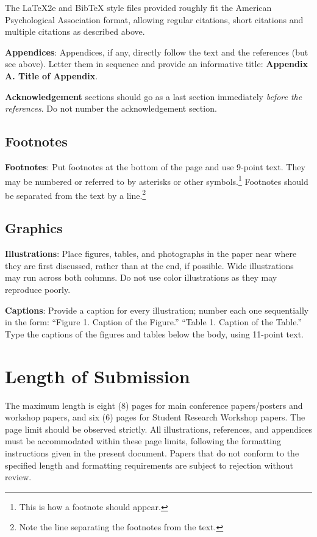 \documentclass[11pt]{article}
\begin{document}
The \LaTeX2e{} and Bib\TeX{} style files provided roughly fit the
American Psychological Association format, allowing regular citations, 
short citations and multiple citations as described above.

{\bf Appendices}: Appendices, if any, directly follow the text and the
references (but see above).  Letter them in sequence and provide an
informative title: {\bf Appendix A. Title of Appendix}.

\textbf{Acknowledgement} sections should go as a last section immediately
\emph{before the references}.  Do not number the acknowledgement section.

\subsection{Footnotes}

{\bf Footnotes}: Put footnotes at the bottom of the page and use 9-point text. They may be numbered or referred to by asterisks or other
symbols.\footnote{This is how a footnote should appear.} Footnotes
should be separated from the text by a line.\footnote{Note the line
separating the footnotes from the text.}

\subsection{Graphics}

{\bf Illustrations}: Place figures, tables, and photographs in the
paper near where they are first discussed, rather than at the end, if
possible.  Wide illustrations may run across both columns. Do not use
color illustrations as they may reproduce poorly.

{\bf Captions}: Provide a caption for every illustration; number each one
sequentially in the form:  ``Figure 1. Caption of the Figure.'' ``Table 1.
Caption of the Table.''  Type the captions of the figures and 
tables below the body, using 11-point text.  


\section{Length of Submission}
\label{sec:length}

The maximum length is eight ($8$) pages for main conference papers/posters and workshop papers, and six ($6$) pages for Student Research Workshop papers. The page limit should be observed strictly. All illustrations, references, and appendices must be accommodated within these page limits, following the formatting instructions given in the present document.  Papers that do not conform to the specified length and formatting requirements are subject to rejection without review.
\end{document}
